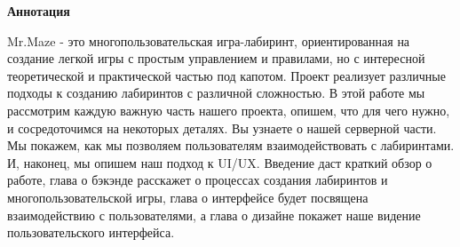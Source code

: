 \newpage
\pagestyle{plain}

{
\begin{center}
    \Large
    \textbf{Аннотация}
\end{center}
Mr.Maze - это многопользовательская игра-лабиринт, ориентированная на создание легкой игры с простым управлением и правилами, но с интересной теоретической и практической частью под капотом. Проект реализует различные подходы к созданию лабиринтов с различной сложностью. В этой работе мы рассмотрим каждую важную часть нашего проекта, опишем, что для чего нужно, и сосредоточимся на некоторых деталях. Вы узнаете о нашей серверной части. Мы покажем, как мы позволяем пользователям взаимодействовать с лабиринтами. И, наконец, мы опишем наш подход к UI/UX. Введение даст краткий обзор о работе, глава о бэкэнде расскажет о процессах создания лабиринтов и многопользовательской игры, глава о интерфейсе будет посвящена взаимодействию с пользователями, а глава о дизайне покажет наше видение пользовательского интерфейса.
}